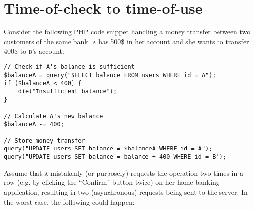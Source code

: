 \section{Time-of-check to time-of-use}

Consider the following PHP code snippet handling a money transfer between two customers of the same bank. \textsc{a} has 500\$ in her account and she wants to transfer 400\$ to \textsc{b}'s account.

\begin{verbatim}
// Check if A's balance is sufficient
$balanceA = query("SELECT balance FROM users WHERE id = A");
if ($balanceA < 400) {
    die("Insufficient balance");
}

// Calculate A's new balance
$balanceA -= 400;

// Store money transfer
query("UPDATE users SET balance = $balanceA WHERE id = A");
query("UPDATE users SET balance = balance + 400 WHERE id = B");
\end{verbatim}

Assume that \textsc{a} mistakenly (or purposely) requests the operation two times in a row (e.g. by clicking the ``Confirm'' button twice) on her home banking application, resulting in two (asynchronous) requests being sent to the server. In the worst case, the following could happen:

